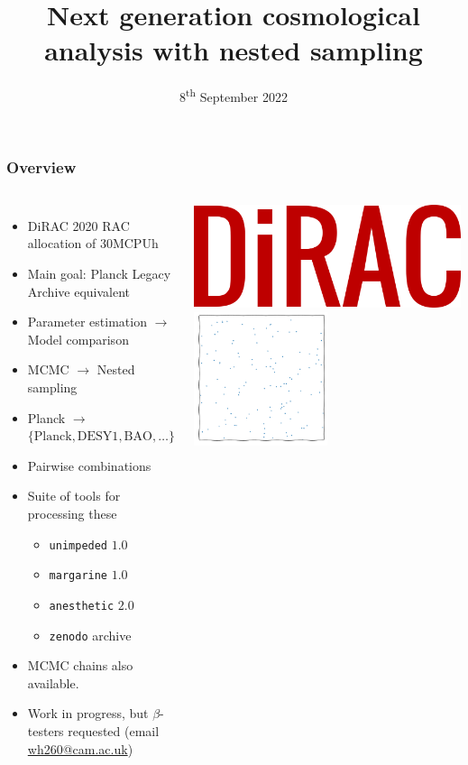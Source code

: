 \documentclass[aspectratio=169]{beamer}
\title{Next generation cosmological analysis with nested sampling}
\date{8\textsuperscript{th} September 2022}
\begin{document}
\begin{frame}
    \titlepage
\end{frame}

\begin{frame}
    \frametitle{Overview}
    \begin{columns}
        \begin{itemize}
            \item DiRAC 2020 RAC allocation of 30MCPUh
            \item Main goal: Planck Legacy Archive equivalent
            \item Parameter estimation $\to$ Model comparison
            \item MCMC $\to$ Nested sampling
            \item Planck $\to$ $\{\text{Planck}, \text{DESY1}, \text{BAO}, \ldots \}$
            \item Pairwise combinations
            \item Suite of tools for processing these 
                \begin{itemize}
                    \item \texttt{unimpeded} $1.0$
                    \item \texttt{margarine} $1.0$
                    \item \texttt{anesthetic} $2.0$
                    \item \texttt{zenodo} archive
                \end{itemize}
            \item MCMC chains also available.
            \item Work in progress, but $\beta$-testers requested (email \href{mailto:wh260@cam.ac.uk}{wh260@cam.ac.uk})
        \end{itemize}
        \includegraphics[width=\textwidth]{logos/dirac}
        \includegraphics[width=0.5\textwidth,page=21]{figures/himmelblau}%

\end{columns}
\end{frame}
\end{document}
